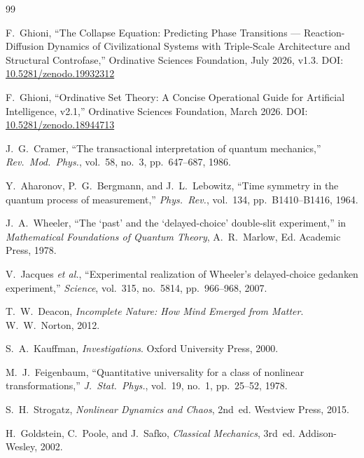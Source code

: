 \documentclass[12pt,a4paper]{article}
\begin{document}
\begin{thebibliography}{99}

F.~Ghioni, ``The Collapse Equation: Predicting Phase Transitions --- Reaction-Diffusion Dynamics of Civilizational Systems with Triple-Scale Architecture and Structural Controfase,'' Ordinative Sciences Foundation, July 2026, v1.3. DOI: \href{https://doi.org/10.5281/zenodo.19932312}{10.5281/zenodo.19932312}

F.~Ghioni, ``Ordinative Set Theory: A Concise Operational Guide for Artificial Intelligence, v2.1,'' Ordinative Sciences Foundation, March 2026. DOI: \href{https://doi.org/10.5281/zenodo.18944713}{10.5281/zenodo.18944713}

J.~G.~Cramer, ``The transactional interpretation of quantum mechanics,'' \textit{Rev.~Mod.~Phys.}, vol.~58, no.~3, pp.~647--687, 1986.

Y.~Aharonov, P.~G.~Bergmann, and J.~L.~Lebowitz, ``Time symmetry in the quantum process of measurement,'' \textit{Phys.~Rev.}, vol.~134, pp.~B1410--B1416, 1964.

J.~A.~Wheeler, ``The `past' and the `delayed-choice' double-slit experiment,'' in \textit{Mathematical Foundations of Quantum Theory}, A.~R.~Marlow, Ed. Academic Press, 1978.

V.~Jacques \textit{et al.}, ``Experimental realization of Wheeler's delayed-choice gedanken experiment,'' \textit{Science}, vol.~315, no.~5814, pp.~966--968, 2007.

T.~W.~Deacon, \textit{Incomplete Nature: How Mind Emerged from Matter}. W.~W.~Norton, 2012.

S.~A.~Kauffman, \textit{Investigations}. Oxford University Press, 2000.

M.~J.~Feigenbaum, ``Quantitative universality for a class of nonlinear transformations,'' \textit{J.~Stat.~Phys.}, vol.~19, no.~1, pp.~25--52, 1978.

S.~H.~Strogatz, \textit{Nonlinear Dynamics and Chaos}, 2nd~ed. Westview Press, 2015.

H.~Goldstein, C.~Poole, and J.~Safko, \textit{Classical Mechanics}, 3rd~ed. Addison-Wesley, 2002.

\end{thebibliography}
\end{document}
